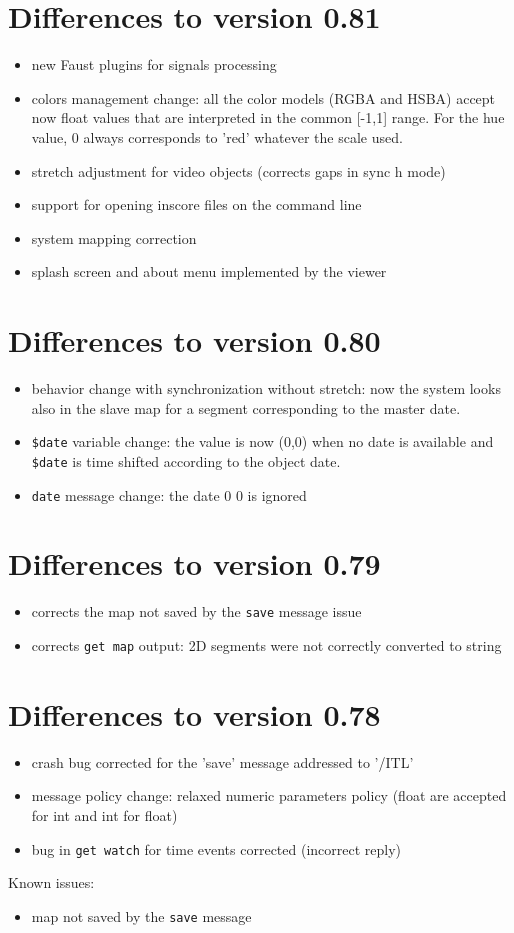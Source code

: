 \documentclass[a4paper,twoside]{report}
\newcommand{\sublevel}[1]	{\section{#1}}
\newcommand{\OSC}[1]		{\texttt{#1}}
\begin{document}
\sublevel{Differences to version 0.81}
\begin{itemize}
\item new Faust plugins for signals processing
\item colors management change: all the color models (RGBA and HSBA) accept now
  float values that are interpreted in the common [-1,1] range. For the
  hue value, 0 always corresponds to 'red' whatever the scale used.
\item stretch adjustment for video objects (corrects gaps in sync h mode)
\item support for opening inscore files on the command line
\item system mapping correction
\item splash screen and about menu implemented by the viewer
\end{itemize}

\sublevel{Differences to version 0.80}
\begin{itemize}
\item behavior change with synchronization without stretch: now the system looks also in the
  slave map for a segment corresponding to the master date.
\item \OSC{\$date} variable change: the value is now (0,0) when no date is available and \OSC{\$date} is time shifted according to the object date.
\item \OSC{date} message change: the date 0 0 is ignored
\end{itemize}


\sublevel{Differences to version 0.79}
\begin{itemize}
\item corrects the map not saved by the \OSC{save} message issue
\item corrects \OSC{get map} output: 2D segments were not correctly converted to string
\end{itemize}

\sublevel{Differences to version 0.78}
\begin{itemize}
\item crash bug corrected for the 'save' message addressed to '/ITL'
\item message policy change: relaxed numeric parameters policy (float are accepted for int and int for float)
\item bug in \OSC{get watch} for time events corrected (incorrect reply)
\end{itemize}
Known issues:
\begin{itemize}
\item map not saved by the \OSC{save} message 
\end{itemize}
\end{document}
